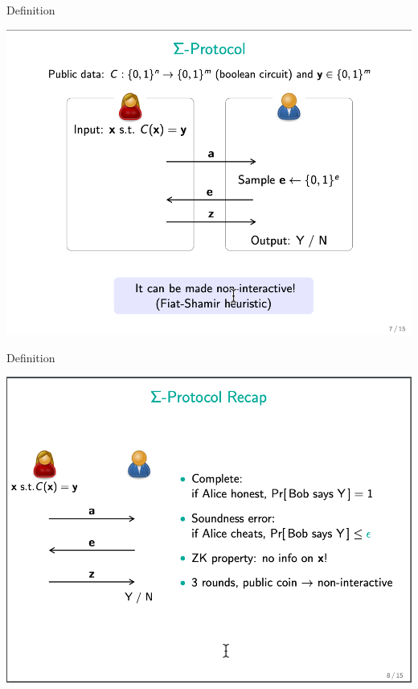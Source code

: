 \documentclass{beamer}
\begin{document}
\begin{frame}{Definition}
	\begin{minipage}{0.42\linewidth}
		\includegraphics[scale=0.4]{f8.png}
	\end{minipage}
\end{frame}


\begin{frame}{Definition}
	\begin{minipage}{0.42\linewidth}
		\includegraphics[scale=0.4]{f9.png}
	\end{minipage}
\end{frame}
\end{document}
